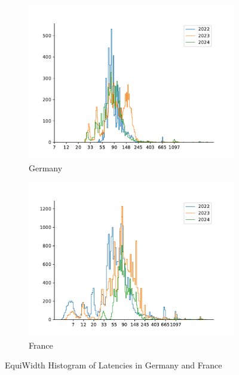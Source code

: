 \begin{figure}
	\centering
	\begin{subfigure}[b]{0.8\linewidth}
		\includegraphics[width=\linewidth]{chapters/4-results/latency/img/histogram_of_latencies_of_starlink_probes_in_germany.pdf}
		\caption{Germany}
	\end{subfigure}
	\begin{subfigure}[b]{0.8\linewidth}
		\includegraphics[width=\linewidth]{chapters/4-results/latency/img/histogram_of_latencies_of_starlink_probes_in_france.pdf}
		\caption{France}
	\end{subfigure}
	\caption{EquiWidth Histogram of Latencies in Germany and France}
	\label{fig:latency-histogram-2}
\end{figure}

